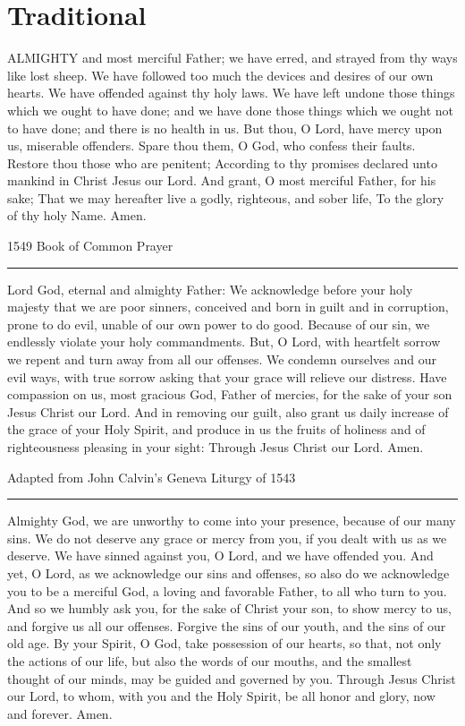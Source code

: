 \documentclass[]{book}
\begin{document}
\section{Traditional}\label{traditional}

ALMIGHTY and most merciful Father; we have erred, and strayed from thy
ways like lost sheep. We have followed too much the devices and desires
of our own hearts. We have offended against thy holy laws. We have left
undone those things which we ought to have done; and we have done those
things which we ought not to have done; and there is no health in us.
But thou, O Lord, have mercy upon us, miserable offenders. Spare thou
them, O God, who confess their faults. Restore thou those who are
penitent; According to thy promises declared unto mankind in Christ
Jesus our Lord. And grant, O most merciful Father, for his sake; That we
may hereafter live a godly, righteous, and sober life, To the glory of
thy holy Name. Amen.

1549 Book of Common Prayer

\begin{center}\rule{0.5\linewidth}{\linethickness}\end{center}

Lord God, eternal and almighty Father: We acknowledge before your holy
majesty that we are poor sinners, conceived and born in guilt and in
corruption, prone to do evil, unable of our own power to do good.
Because of our sin, we endlessly violate your holy commandments. But, O
Lord, with heartfelt sorrow we repent and turn away from all our
offenses. We condemn ourselves and our evil ways, with true sorrow
asking that your grace will relieve our distress. Have compassion on us,
most gracious God, Father of mercies, for the sake of your son Jesus
Christ our Lord. And in removing our guilt, also grant us daily increase
of the grace of your Holy Spirit, and produce in us the fruits of
holiness and of righteousness pleasing in your sight: Through Jesus
Christ our Lord. Amen.

Adapted from John Calvin's Geneva Liturgy of 1543

\begin{center}\rule{0.5\linewidth}{\linethickness}\end{center}

Almighty God, we are unworthy to come into your presence, because of our
many sins. We do not deserve any grace or mercy from you, if you dealt
with us as we deserve. We have sinned against you, O Lord, and we have
offended you. And yet, O Lord, as we acknowledge our sins and offenses,
so also do we acknowledge you to be a merciful God, a loving and
favorable Father, to all who turn to you. And so we humbly ask you, for
the sake of Christ your son, to show mercy to us, and forgive us all our
offenses. Forgive the sins of our youth, and the sins of our old age. By
your Spirit, O God, take possession of our hearts, so that, not only the
actions of our life, but also the words of our mouths, and the smallest
thought of our minds, may be guided and governed by you. Through Jesus
Christ our Lord, to whom, with you and the Holy Spirit, be all honor and
glory, now and forever. Amen.
\end{document}
